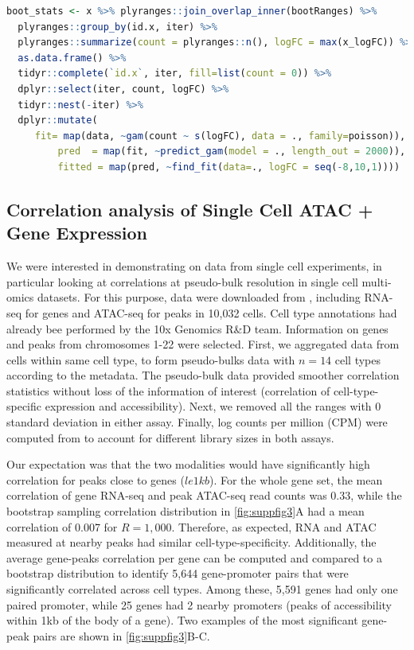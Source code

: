 \documentclass{article}
\begin{document}
\begin{lstlisting}[language=R]
boot_stats <- x %>% plyranges::join_overlap_inner(bootRanges) %>%
  plyranges::group_by(id.x, iter) %>%
  plyranges::summarize(count = plyranges::n(), logFC = max(x_logFC)) %>%
  as.data.frame() %>%
  tidyr::complete(`id.x`, iter, fill=list(count = 0)) %>%
  dplyr::select(iter, count, logFC) %>%
  tidyr::nest(-iter) %>%
  dplyr::mutate(
	 fit= map(data, ~gam(count ~ s(logFC), data = ., family=poisson)),
         pred  = map(fit, ~predict_gam(model = ., length_out = 2000)),
         fitted = map(pred, ~find_fit(data=., logFC = seq(-8,10,1))))

\end{lstlisting} 

\subsection{Correlation analysis of Single Cell ATAC + Gene Expression}

We were interested in demonstrating \bootranges on data from single
cell experiments, in particular looking at correlations at
pseudo-bulk resolution in single cell multi-omics datasets.
For this purpose, 
data were downloaded from \citet{Vignette}, including
RNA-seq for genes and ATAC-seq for peaks in 10,032 cells.
Cell type annotations had already bee performed
by the 10x Genomics R\&D team. Information on genes and peaks from
chromosomes 1-22 were selected.
First, we aggregated data from cells within same cell type, to form
pseudo-bulks data with $n=14$ cell types according to the metadata. 
The pseudo-bulk data provided smoother correlation statistics without
loss of the information of interest (correlation of cell-type-specific
expression and accessibility).
Next, we removed all the ranges with 0
standard deviation in either assay.
Finally, log counts per million (CPM) were computed
from  \citep{edgeR2010Robinson} to account for different library sizes
in both assays.

Our expectation was that the two modalities would have
significantly high correlation for peaks close to genes ($le 1kb$).
For the whole gene set, the mean
correlation of gene RNA-seq and peak ATAC-seq read counts was 0.33, while the
bootstrap sampling correlation distribution in \cref{fig:suppfig3}A
had a mean correlation of 0.007 for $R = 1,000$.
Therefore, as expected, RNA and ATAC
measured at nearby peaks had similar cell-type-specificity.
Additionally, the average gene-peaks correlation per gene can be
computed and compared to a bootstrap distribution to identify 5,644
gene-promoter pairs that were significantly correlated across cell
types. Among these, 5,591 genes had only one paired promoter, while 25
genes had 2 nearby promoters (peaks of accessibility within 1kb of the
body of a gene). 
Two examples of the most significant gene-peak pairs are shown in
\cref{fig:suppfig3}B-C.
\end{document}
